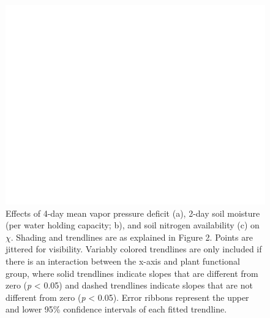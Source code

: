 \newpage
\begin{figure}
    \centering
    \includegraphics[scale = 0.07]{ch4_TXeco/figs/TXeco_fig3_chi.png}
    \caption[Effects of 4-day mean vapor pressure deficit, 2-day soil moisture (per water holding capacity), and soil nitrogen availability on $\chi$. ]{Effects of 4-day mean vapor pressure deficit (a), 2-day soil moisture (per water holding capacity; b), and soil nitrogen availability (c) on $\chi$. Shading and trendlines are as explained in Figure 2. Points are jittered for visibility. Variably colored trendlines are only included if there is an interaction between the x-axis and plant functional group, where solid trendlines indicate slopes that are different from zero (\textit{p} < 0.05) and dashed trendlines indicate slopes that are not different from zero (\textit{p} < 0.05). Error ribbons represent the upper and lower 95\% confidence intervals of each fitted trendline.}
    \label{fig:figure4.3}
\end{figure}
\clearpage


